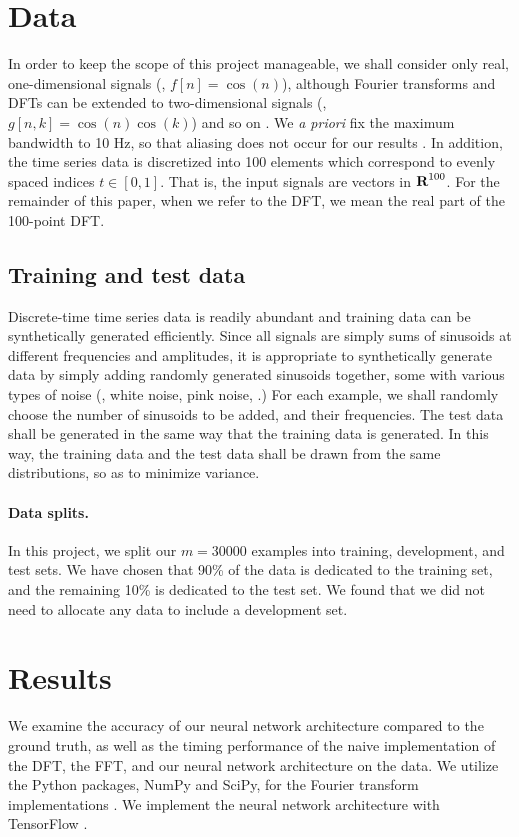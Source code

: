 \documentclass[12pt]{article}
\begin{document}
\section{Data}

In order to keep the scope of this project manageable, we shall consider only real, one-dimensional 
signals (\eg, $f[n] = \cos(n)$), although Fourier transforms and DFTs can be extended to two-dimensional signals 
(\eg, $g[n,k] = \cos(n)\cos(k)$) and so on \cite{O:17}. 
We \emph{a priori} fix the maximum bandwidth to 10 Hz, 
so that aliasing does not occur for our results \cite{OS:99}. In addition, the time series data is discretized 
into 100 elements which correspond to evenly spaced indices $t \in [0,1]$. That is, the input signals are vectors in 
${\mbox{\bf R}}^{100}$. For the remainder of this paper, when we refer to the DFT, we mean the real part of the 
100-point DFT. 


\subsection{Training and test data} Discrete-time time series data is readily abundant and 
training data can be synthetically generated efficiently. Since all signals are simply sums of 
sinusoids at different frequencies and amplitudes, it is appropriate to synthetically generate
data by simply adding randomly generated sinusoids together, some with various types of noise 
(\eg, white noise, pink noise, \etc.) For each example, we shall randomly choose the number of 
sinusoids to be added, and their frequencies. The test data shall be generated in the same way that the 
training data is generated. In this way, the training data and the test data shall be drawn from the same 
distributions, so as to minimize variance.

\paragraph{Data splits.} In this project, we split our $m=30000$ examples into training, development, and test
sets. We have chosen that 90\% of the data is dedicated to the training set, and the remaining 10\% is 
dedicated to the test set. We found that we did not need to allocate any data to include a development set.

\section{Results} 
We examine the accuracy of our neural network architecture compared to the ground truth, as well as the 
timing performance of the naive implementation of the DFT, the FFT, and our neural network architecture
on the data. We utilize the Python packages, NumPy and SciPy, for the Fourier transform implementations 
\cite{SCIPY,NUMPY}. We implement the neural network architecture with TensorFlow \cite{TENSORFLOW}.
\end{document}
